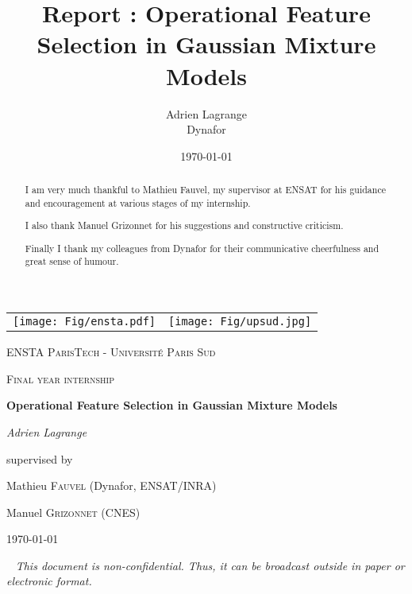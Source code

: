 \documentclass[a4paper,11pt,DIV=16,abstracton]{scrartcl}
\title{Report : Operational Feature Selection in Gaussian Mixture Models}
\author{Adrien Lagrange
\\
\small{Dynafor}}
\date{\today}
\newcommand\blankpage{%
    \null
    \thispagestyle{empty}%
    \newpage}
\begin{document}

\begin{titlepage}
    \centering
    \begin{tabular}{cc}
        \texttt{[image: Fig/ensta.pdf]}\par\vspace{1cm} &
        \texttt{[image: Fig/upsud.jpg]}\par\vspace{1cm} \\
    \end{tabular}

    {\scshape\LARGE ENSTA ParisTech - Université Paris Sud \par}
    \vspace{1cm}
    {\scshape\Large Final year internship\par}
    \vspace{1.5cm}
    {\huge\bfseries Operational Feature Selection in Gaussian Mixture Models\par}
    \vspace{2cm}
    {\Large\itshape Adrien Lagrange\par}
    \vfill
    supervised by\par
    Mathieu \textsc{Fauvel} (Dynafor, ENSAT/INRA)\par
    Manuel \textsc{Grizonnet} (CNES)

    \vfill

    {\large \today\par}

\end{titlepage}

\thispagestyle{empty}
\mbox{~}
\vfill
{\color{red}\Large\itshape This document is non-confidential. Thus, it can be broadcast outside in paper or electronic format.}
\newpage

\renewcommand{\abstractname}{Acknowledgements}
\begin{abstract}
I am very much thankful to Mathieu Fauvel, my supervisor at ENSAT for his guidance and encouragement at various stages of my internship.

I also thank Manuel Grizonnet for his suggestions and constructive criticism.

Finally I thank my colleagues from Dynafor for their communicative cheerfulness and great sense of humour.
\end{abstract}
\end{document}

